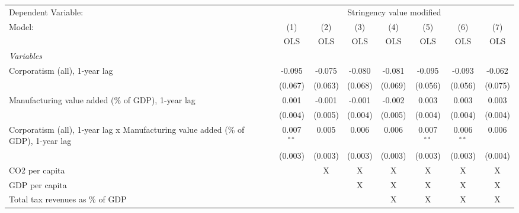 
\begingroup
\centering
\begin{tabular}{lccccccc}
   \toprule
   Dependent Variable: & \multicolumn{7}{c}{Stringency value modified}\\
   Model:                                                                             & (1)          & (2)     & (3)     & (4)     & (5)          & (6)          & (7)\\  
                                                                                      &  OLS         & OLS     & OLS     & OLS     & OLS          & OLS          & OLS\\  
   \midrule
   \emph{Variables}\\
   Corporatism (all), 1-year lag                                                      & -0.095       & -0.075  & -0.080  & -0.081  & -0.095       & -0.093       & -0.062\\   
                                                                                      & (0.067)      & (0.063) & (0.068) & (0.069) & (0.056)      & (0.056)      & (0.075)\\   
   Manufacturing value added (\% of GDP), 1-year lag                                  & 0.001        & -0.001  & -0.001  & -0.002  & 0.003        & 0.003        & 0.003\\   
                                                                                      & (0.004)      & (0.005) & (0.004) & (0.005) & (0.004)      & (0.004)      & (0.004)\\   
   Corporatism (all), 1-year lag x Manufacturing value added (\% of GDP), 1-year lag  & 0.007$^{**}$ & 0.005   & 0.006   & 0.006   & 0.007$^{**}$ & 0.006$^{**}$ & 0.006\\   
                                                                                      & (0.003)      & (0.003) & (0.003) & (0.003) & (0.003)      & (0.003)      & (0.004)\\   
   CO2 per capita                                                                     &              & X       & X       & X       & X            & X            & X\\  
   GDP per capita                                                                     &              &         & X       & X       & X            & X            & X\\  
   Total tax revenues as \% of GDP                                                    &              &         &         & X       & X            & X            & X\\  

\end{tabular}
